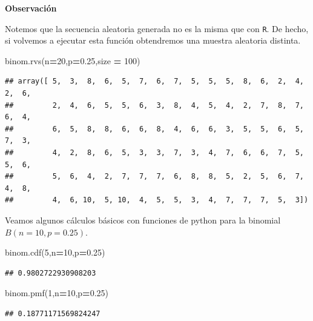 \documentclass[]{book}
\newenvironment{Shaded}{\begin{snugshade}}{\end{snugshade}}
\newcommand{\DecValTok}[1]{\textcolor[rgb]{0.00,0.00,0.81}{#1}}
\newcommand{\FloatTok}[1]{\textcolor[rgb]{0.00,0.00,0.81}{#1}}
\newcommand{\NormalTok}[1]{#1}
\newcommand{\OperatorTok}[1]{\textcolor[rgb]{0.81,0.36,0.00}{\textbf{#1}}}
\begin{document}
\textbf{Observación}

Notemos que la secuencia aleatoria generada no es la misma que con \texttt{R}. De hecho, si volvemos a ejecutar esta función obtendremos una muestra aleatoria distinta.

\begin{Shaded}
\begin{Highlighting}[]
\NormalTok{binom.rvs(n}\OperatorTok{=}\DecValTok{20}\NormalTok{,p}\OperatorTok{=}\FloatTok{0.25}\NormalTok{,size }\OperatorTok{=} \DecValTok{100}\NormalTok{)}
\end{Highlighting}
\end{Shaded}

\begin{verbatim}
## array([ 5,  3,  8,  6,  5,  7,  6,  7,  5,  5,  5,  8,  6,  2,  4,  2,  6,
##         2,  4,  6,  5,  5,  6,  3,  8,  4,  5,  4,  2,  7,  8,  7,  6,  4,
##         6,  5,  8,  8,  6,  6,  8,  4,  6,  6,  3,  5,  5,  6,  5,  7,  3,
##         4,  2,  8,  6,  5,  3,  3,  7,  3,  4,  7,  6,  6,  7,  5,  5,  6,
##         5,  6,  4,  2,  7,  7,  7,  6,  8,  8,  5,  2,  5,  6,  7,  4,  8,
##         4,  6, 10,  5, 10,  4,  5,  5,  3,  4,  7,  7,  7,  5,  3])
\end{verbatim}

Veamos algunos cálculos básicos con funciones de python para la binomial \(B(n=10,p=0.25)\).

\begin{Shaded}
\begin{Highlighting}[]
\NormalTok{binom.cdf(}\DecValTok{5}\NormalTok{,n}\OperatorTok{=}\DecValTok{10}\NormalTok{,p}\OperatorTok{=}\FloatTok{0.25}\NormalTok{)}
\end{Highlighting}
\end{Shaded}

\begin{verbatim}
## 0.9802722930908203
\end{verbatim}

\begin{Shaded}
\begin{Highlighting}[]
\NormalTok{binom.pmf(}\DecValTok{1}\NormalTok{,n}\OperatorTok{=}\DecValTok{10}\NormalTok{,p}\OperatorTok{=}\FloatTok{0.25}\NormalTok{)}
\end{Highlighting}
\end{Shaded}

\begin{verbatim}
## 0.18771171569824247
\end{verbatim}
\end{document}
